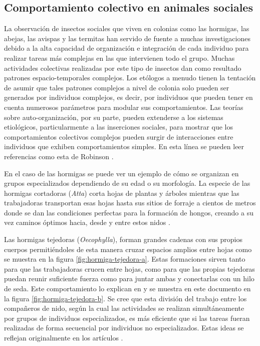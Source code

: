 \subsection{Comportamiento colectivo en animales sociales}\label{s2_1_1}
La observación de insectos sociales que viven en colonias como las hormigas, las abejas, las avispas y las termitas han servido de fuente a muchas investigaciones debido a la alta capacidad de organización e integración de cada individuo para realizar tareas más complejas en las que intervienen todo el grupo. Muchas actividades colectivas realizadas por este tipo de insectos dan como resultado patrones espacio-temporales complejos. Los etólogos a menudo tienen la tentación de asumir que tales patrones complejos a nivel de colonia solo pueden ser generados por individuos complejos, es decir, por individuos que pueden tener en cuenta numerosos parámetros para modular sus comportamientos.  Las teorías sobre auto-organización, por su parte, pueden extenderse a los sistemas etiológicos, particularmente a las inserciones sociales, para mostrar que los comportamientos colectivos complejos pueden surgir de interacciones entre individuos que exhiben comportamientos simples. En esta línea se pueden leer referencias como esta de Robinson \cite{robinson1992regulation}.

En el caso de las hormigas se puede ver un ejemplo de cómo se organizan en grupos especializados dependiendo de su edad o su morfología. La especie de las hormigas cortadoras (\textit{Atta}) corta hojas de plantas y árboles mientras que las trabajadoras transportan esas hojas hasta sus sitios de forraje a cientos de metros donde se dan las condiciones perfectas para la formación de hongos, creando a su vez caminos óptimos hacia, desde y entre estos nidos \cite{CherrettAtta}.

Las hormigas tejedoras (\textit{Oecophylla}), forman grandes cadenas con sus propios cuerpos permitiéndoles de esta manera cruzar espacios amplios entre hojas como se muestra en la figura \ref{fig:hormiga-tejedora-a}. Estas formaciones sirven tanto para que las trabajadoras crucen entre hojas, como para que las propias tejedoras puedan reunir suficiente fuerza como para juntar ambas y conectarlas con un hilo de seda. Este comportamiento lo explican  \citeauthor*{bonabeau1999swarm} en \cite{bonabeau1999swarm} y se muestra en este documento en la figura \ref{fig:hormiga-tejedora-b}. Se cree que esta división del trabajo entre los compañeros de nido, según la cual las actividades se realizan simultáneamente por grupos de individuos especializados, es más eficiente que si las tareas fueran realizadas de forma secuencial por individuos no especializados. Estas ideas se reflejan originalmente en los artículos \cite{jeanne1986evolution,robinson1992regulation}.


